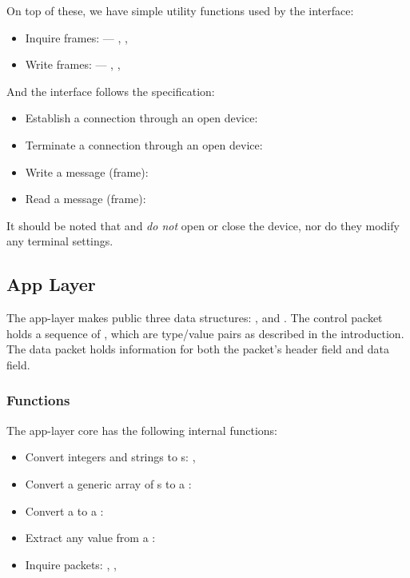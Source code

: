 \documentclass[main.tex]{subfiles}
\begin{document}
On top of these, we have simple utility functions used by the interface:

\begin{itemize}[noitemsep,rightmargin=3em]
	\item Inquire frames:  --- , , \textellipsis
	\item Write frames:  --- , , \textellipsis
\end{itemize}

And the interface follows the specification:

\begin{itemize}[noitemsep,rightmargin=3em]
	\item Establish a connection through an open device: 
	\item Terminate a connection through an open device: 
	\item Write a message (frame): 
	\item Read a message (frame): 
\end{itemize}

It should be noted that  and  \emph{do not} open or close the device, nor do they modify any terminal settings.

\subsection{App Layer}
\label{subsec:alarch}

The app-layer makes public three data structures: ,  and . The control packet holds a sequence of , which are type/value pairs as described in the introduction. The data packet holds information for both the packet's header field and data field.

\subsubsection{Functions}
\label{subsubsec:funcalarch}

The app-layer core has the following internal functions:

\begin{itemize}[noitemsep,rightmargin=3em]
	\item Convert integers and strings to s: , 
	\item Convert a generic array of s to a : 
	\item Convert a  to a : 
	\item Extract any  value from a : 
	\item Inquire packets: , , 
\end{itemize}
\end{document}
